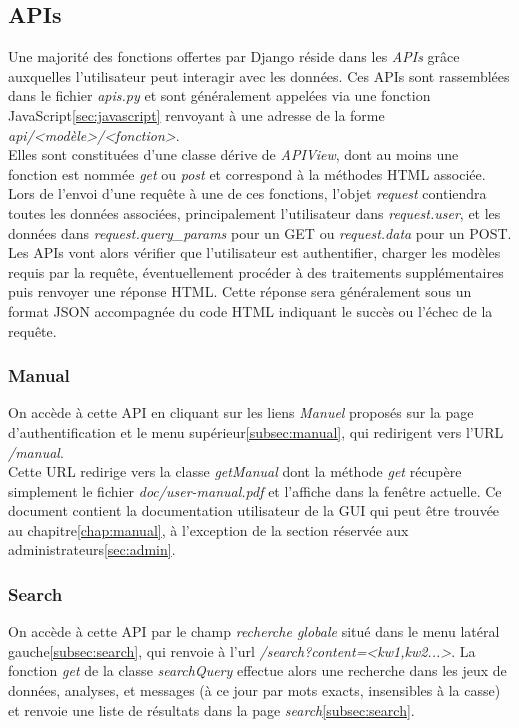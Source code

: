 \documentclass[a4paper]{report}
\begin{document}
\subsection{APIs}
\label{subsec:API}
Une majorité des fonctions offertes par Django réside dans les \emph{APIs} grâce auxquelles l'utilisateur peut interagir avec les données. Ces APIs sont rassemblées dans le fichier \emph{apis.py} et sont généralement appelées via une fonction JavaScript\ref{sec:javascript} renvoyant à une adresse de la forme \emph{api/<modèle>/<fonction>}.\\

Elles sont constituées d'une classe dérive de \emph{APIView}, dont au moins une fonction est nommée \emph{get} ou \emph{post} et correspond à la méthodes HTML associée. Lors de l'envoi d'une requête à une de ces fonctions, l'objet \emph{request} contiendra toutes les données associées, principalement l'utilisateur dans \emph{request.user}, et les données dans \emph{request.query\_params} pour un GET ou \emph{request.data} pour un POST.\\

Les APIs vont alors vérifier que l'utilisateur est authentifier, charger les modèles requis par la requête, éventuellement procéder à des traitements supplémentaires puis renvoyer une réponse HTML. Cette réponse sera généralement sous un format JSON accompagnée du code HTML indiquant le succès ou l'échec de la requête.

\subsubsection{Manual}
On accède à cette API en cliquant sur les liens \emph{Manuel} proposés sur la page d'authentification et le menu supérieur\ref{subsec:manual}, qui redirigent vers l'URL \emph{/manual}.\\

Cette URL redirige vers la classe \emph{getManual} dont la méthode \emph{get} récupère simplement le fichier \emph{doc/user-manual.pdf} et l'affiche dans la fenêtre actuelle. Ce document contient la documentation utilisateur de la GUI qui peut être trouvée au chapitre\ref{chap:manual}, à l'exception de la section réservée aux administrateurs\ref{sec:admin}.

\subsubsection{Search}
On accède à cette API par le champ \emph{recherche globale} situé dans le menu latéral gauche\ref{subsec:search}, qui renvoie à l'url \emph{/search?content=<kw1,kw2...>}.
La fonction \emph{get} de la classe \emph{searchQuery} effectue alors une recherche dans les jeux de données, analyses, et messages (à ce jour par mots exacts, insensibles à la casse) et renvoie une liste de résultats dans la page \emph{search}\ref{subsec:search}.\\
\end{document}
